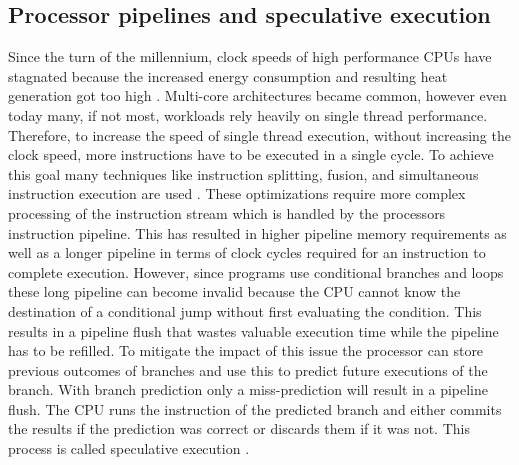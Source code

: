 \documentclass[conference,compsoc,final,a4paper]{IEEEtran}
\begin{document}
\subsection{Processor pipelines and speculative execution}
Since the turn of the millennium, clock speeds of high performance CPUs have stagnated because the increased energy consumption and resulting heat generation got too high \cite{fog2012microarchitecture}. Multi-core architectures became common, however even today many, if not most, workloads rely heavily on single thread performance. Therefore, to increase the speed of single thread execution, without increasing the clock speed, more instructions have to be executed in a single cycle. To achieve this goal many techniques like instruction splitting, fusion, and simultaneous instruction execution are used \cite{fog2012microarchitecture}. These optimizations require more complex processing of the instruction stream which is handled by the processors instruction pipeline. This has resulted in higher pipeline memory requirements as well as a longer pipeline in terms of clock cycles required for an instruction to complete execution. However, since programs use conditional branches and loops these long pipeline can become invalid because the CPU cannot know the destination of a conditional jump without first evaluating the condition. This results in a pipeline flush that wastes valuable execution time while the pipeline has to be refilled. To mitigate the impact of this issue the processor can store previous outcomes of branches and use this to predict future executions of the branch. With branch prediction only a miss-prediction will result in a pipeline flush. The CPU runs the instruction of the predicted branch and either commits the results if the prediction was correct or discards them if it was not. This process is called speculative execution \cite{kocher2018spectre}.
\end{document}
